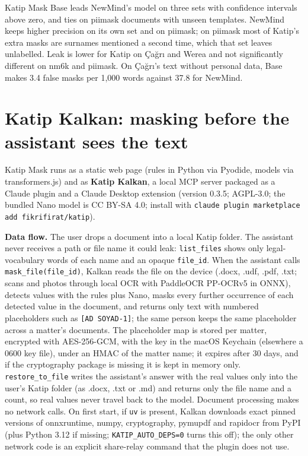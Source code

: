 \documentclass[10pt,twocolumn]{article}
\begin{document}
Katip Mask Base leads NewMind's model on three sets with confidence intervals above zero, and ties on piimask
documents with unseen templates. NewMind keeps higher precision on its own set and on piimask; on piimask most of
Katip's extra masks are surnames mentioned a second time, which that set leaves unlabelled. Leak is lower for Katip
on \c{C}a\u{g}r\i{} and Werea and not significantly different on nm6k and piimask. On \c{C}a\u{g}r\i{}'s text without
personal data, Base makes 3.4 false masks per 1,000 words against 37.8 for NewMind.

\section{Katip Kalkan: masking before the assistant sees the text}
\label{sec:kalkan}
Katip Mask runs as a static web page (rules in Python via Pyodide, models via transformers.js) and as
\textbf{Katip Kalkan}, a local MCP server packaged as a Claude plugin and a Claude Desktop extension (version
0.3.5; AGPL-3.0; the bundled Nano model is CC BY-SA 4.0; install with
\texttt{claude plugin marketplace add fikrifirat/katip}).

\textbf{Data flow.} The user drops a document into a local Katip folder. The assistant never receives a path or
file name it could leak: \texttt{list\_files} shows only legal-vocabulary words of each name and an opaque
\texttt{file\_id}. When the assistant calls \texttt{mask\_file(file\_id)}, Kalkan reads the file on the device
(.docx, .udf, .pdf, .txt; scans and photos through local OCR with PaddleOCR PP-OCRv5 in ONNX), detects values with
the rules plus Nano, masks every further occurrence of each detected value in the document, and returns only text
with numbered placeholders such as \texttt{[AD SOYAD-1]}; the same person keeps the same placeholder across a
matter's documents. The placeholder map is stored per matter, encrypted with AES-256-GCM, with the key in the
macOS Keychain (elsewhere a 0600 key file), under an HMAC of the matter name; it expires after 30 days, and if the
cryptography package is missing it is kept in memory only. \texttt{restore\_to\_file} writes the assistant's answer
with the real values only into the user's Katip folder (as .docx, .txt or .md) and returns only the file name and a count, so
real values never travel back to the model. Document processing makes no network calls. On first start, if
\texttt{uv} is present, Kalkan downloads exact pinned versions of onnxruntime, numpy, cryptography, pymupdf and
rapidocr from PyPI (plus Python 3.12 if missing; \texttt{KATIP\_AUTO\_DEPS=0} turns this off); the only other network code is an explicit share-relay command
that the plugin does not use.
\end{document}
